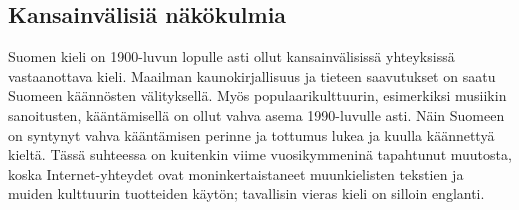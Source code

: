 \begin{multicols}{2}
\subsection{Kansainvälisiä näkökulmia}

Suomen kieli on 1900-luvun lopulle asti ollut kansainvälisissä
yhteyksissä vastaanottava kieli. Maailman kaunokirjallisuus ja tieteen
saavutukset on saatu Suomeen käännösten välityksellä. Myös
populaarikulttuurin, esimerkiksi musiikin sanoitusten, kääntämisellä
on ollut vahva asema 1990-luvulle asti. Näin Suomeen on syntynyt vahva
kääntämisen perinne ja tottumus lukea ja kuulla käännettyä
kieltä. Tässä suhteessa on kuitenkin viime vuosikymmeninä tapahtunut
muutosta, koska Internet-yhteydet ovat moninkertaistaneet
muunkielisten tekstien ja muiden kulttuurin tuotteiden käytön;
tavallisin vieras kieli on silloin englanti.


\end{multicols}
